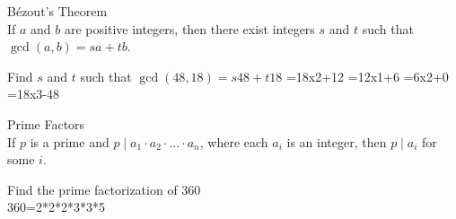\begin{thm}{Bézout's Theorem}$ $\\
If $a$ and $b$ are positive integers, then there exist integers $s$ and $t$ such that $\gcd(a, b) = sa + tb$.
\end{thm}
\begin{exmp}
Find $s$ and $t$ such that $\gcd(48,18)= s48 + t18$
\vspace{2cm}
=18x2+12
=12x1+6
=6x2+0
=18x3-48
\end{exmp}

\begin{thm}{Prime Factors}$ $\\
If $p$ is a prime and $p \mid a_1 \cdot a_2 \cdot \ldots \cdot a_n$, where each $a_i$ is an integer, then $p \mid a_i$ for some $i$.
\end{thm}
\begin{exmp}{Find the prime factorization of 360}
\vspace{2cm} $ $\\
360=2*2*2*3*3*5
\end{exmp}

